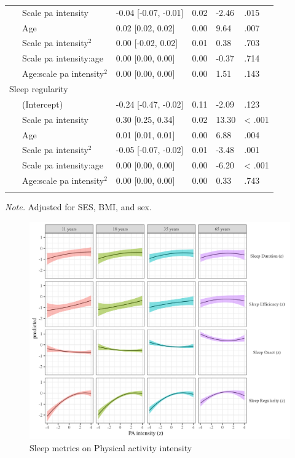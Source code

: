 \documentclass[
  man]{apa6}
\begin{document}
\begin{table}[tbp]
\begin{center}
\begin{threeparttable}
\begin{tabular}{lllll}
\ \ \ Scale  pa  intensity & -0.04 [-0.07, -0.01] & 0.02 & -2.46 & .015\\
\ \ \ Age & 0.02 [0.02, 0.02] & 0.00 & 9.64 & .007\\
\ \ \ Scale  pa  intensity$^2$ & 0.00 [-0.02, 0.02] & 0.01 & 0.38 & .703\\
\ \ \ Scale  pa  intensity:age & 0.00 [0.00, 0.00] & 0.00 & -0.37 & .714\\
\ \ \ Age:scale  pa  intensity$^2$ & 0.00 [0.00, 0.00] & 0.00 & 1.51 & .143\\
Sleep regularity &  &  &  & \\
\ \ \ (Intercept) & -0.24 [-0.47, -0.02] & 0.11 & -2.09 & .123\\
\ \ \ Scale  pa  intensity & 0.30 [0.25, 0.34] & 0.02 & 13.30 & < .001\\
\ \ \ Age & 0.01 [0.01, 0.01] & 0.00 & 6.88 & .004\\
\ \ \ Scale  pa  intensity$^2$ & -0.05 [-0.07, -0.02] & 0.01 & -3.48 & .001\\
\ \ \ Scale  pa  intensity:age & 0.00 [0.00, 0.00] & 0.00 & -6.20 & < .001\\
\ \ \ Age:scale  pa  intensity$^2$ & 0.00 [0.00, 0.00] & 0.00 & 0.33 & .743\\
\bottomrule
\addlinespace
\end{tabular}

\begin{tablenotes}[para]
\normalsize{\textit{Note.} Adjusted for SES, BMI, and sex. }
\end{tablenotes}

\end{threeparttable}
\end{center}

\end{table}

\begin{figure}
\includegraphics[width=7.08in]{../Figures/sleep on pa_intensity} \caption{Sleep metrics on Physical activity intensity}\label{fig:sleep-by-intensity-fig}
\end{figure}
\end{document}
